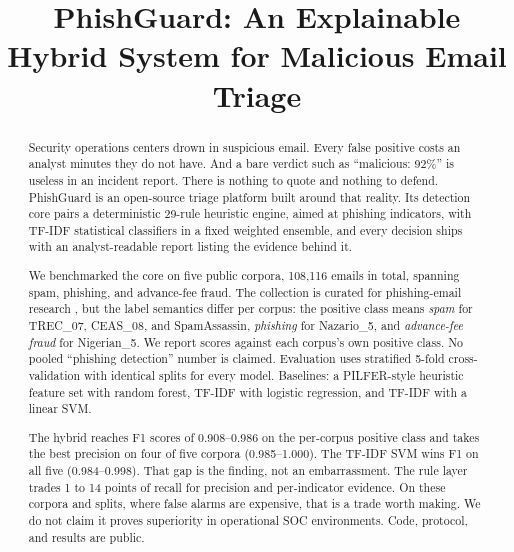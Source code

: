 \documentclass[conference]{IEEEtran}
\begin{document}
\title{PhishGuard: An Explainable Hybrid System for Malicious Email Triage}

\author{
}

\maketitle

\begin{abstract}
Security operations centers drown in suspicious email. Every false positive
costs an analyst minutes they do not have. And a bare verdict such as
``malicious: 92\%'' is useless in an incident report. There is nothing to
quote and nothing to defend. PhishGuard is an open-source triage platform
built around that reality. Its detection core pairs a deterministic 29-rule
heuristic engine, aimed at phishing indicators, with TF-IDF statistical
classifiers in a fixed weighted ensemble, and every decision ships with an
analyst-readable report listing the evidence behind it.

We benchmarked the core on five public corpora, 108,116 emails in total,
spanning spam, phishing, and advance-fee fraud. The collection is curated for
phishing-email research \cite{phishcurated,champa2024curated}, but the label
semantics differ per corpus: the positive class means \textit{spam} for
TREC\_07, CEAS\_08, and SpamAssassin, \textit{phishing} for Nazario\_5, and
\textit{advance-fee fraud} for Nigerian\_5. We report scores against each
corpus's own positive class. No pooled ``phishing detection'' number is
claimed. Evaluation uses stratified 5-fold cross-validation with identical
splits for every model. Baselines: a PILFER-style heuristic feature set with
random forest, TF-IDF with logistic regression, and TF-IDF with a linear SVM.

The hybrid reaches F1 scores of 0.908--0.986 on the per-corpus positive class
and takes the best precision on four of five corpora (0.985--1.000). The
TF-IDF SVM wins F1 on all five (0.984--0.998). That gap is the finding, not
an embarrassment. The rule layer trades 1 to 14 points of recall for
precision and per-indicator evidence. On these corpora and splits, where
false alarms are expensive, that is a trade worth making. We do not claim it
proves superiority in operational SOC environments. Code, protocol, and
results are public.
\end{abstract}
\end{document}
